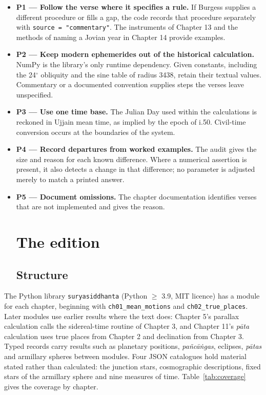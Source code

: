 \documentclass[11pt,a4paper]{article}
\begin{document}
\begin{itemize}
\item \textbf{P1 --- Follow the verse where it specifies a rule.} If Burgess supplies a different procedure or fills a gap, the code records that procedure separately with \texttt{source = "commentary"}. The instruments of Chapter 13 and the methods of naming a Jovian year in Chapter 14 provide examples.
\item \textbf{P2 --- Keep modern ephemerides out of the historical calculation.} NumPy is the library's only runtime dependency. Given constants, including the 24$^\circ$ obliquity and the sine table of radius 3438, retain their textual values. Commentary or a documented convention supplies steps the verses leave unspecified.
\item \textbf{P3 --- Use one time base.} The Julian Day used within the calculations is reckoned in Ujjain mean time, as implied by the epoch of i.50. Civil-time conversion occurs at the boundaries of the system.
\item \textbf{P4 --- Record departures from worked examples.} The audit gives the size and reason for each known difference. Where a numerical assertion is present, it also detects a change in that difference; no parameter is adjusted merely to match a printed answer.
\item \textbf{P5 --- Document omissions.} The chapter documentation identifies verses that are not implemented and gives the reason.
\section{The edition}
\label{sec:edition}

\subsection{Structure}

\end{itemize}

The Python library \texttt{suryasiddhanta} (Python $\geq$ 3.9, MIT licence) has a module for each chapter, beginning with \texttt{ch01\_mean\_motions} and \texttt{ch02\_true\_places}. Later modules use earlier results where the text does: Chapter 5's parallax calculation calls the sidereal-time routine of Chapter 3, and Chapter 11's \textit{p\={a}ta} calculation uses true places from Chapter 2 and declination from Chapter 3. Typed records carry results such as planetary positions, \textit{pa\~{n}c\={a}\.{n}gas}, eclipses, \textit{p\={a}tas} and armillary spheres between modules. Four JSON catalogues hold material stated rather than calculated: the junction stars, cosmographic descriptions, fixed stars of the armillary sphere and nine measures of time. Table~\ref{tab:coverage} gives the coverage by chapter.
\end{document}
